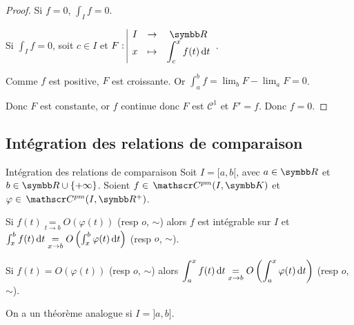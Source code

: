 \begin{proof}
    Si $f = 0$, $\int_I f = 0$.

    Si $\int_{I } f = 0$, soit $c \in I$ et $\fonction F I \R x {\int_c^x f(t) \dt}$.

    Comme $f$ est positive, $F$ est croissante. Or $\int_{a }^{b } f = \lim_b F - \lim_a F = 0$. 

    Donc $F$ est constante, or $f$ continue donc $F$ est $\mathscr C^1$ et $F' = f$. Donc 
    $f = 0$.
\end{proof}


\subsection{Intégration des relations de comparaison}

\begin{theoreme}{Intégration des relations de comparaison}{}
    Soit $I = [a,b[$, avec $a \in \R$ et $b \in \R \cup \{+\infty\}$. 
    Soient $f \in \mc {pm} (I, \K)$ et $\varphi \in \mc {pm}(I, \R^+)$.

    
    \svspace Si $f(t) \underset{t \to b }{=} O(\varphi(t))$ (resp $o$, $\sim$) alors $f$ est intégrable sur $I$ 
    et $\int_x^b f(t) \,\mathrm{d}t \underset{x \to b }{=} O\left( \int_x^b \varphi(t) \,\mathrm{d}t \right)$ (resp $o$, $\sim$).


    \svspace Si $f(t) = O(\varphi(t))$ (resp $o$, $\sim$) alors 
    $\displaystyle \int_{a }^{x } f(t) \,\mathrm{d}t \underset{x \to b }{=} O\left( \int_{a }^{x } \varphi(t) \,\mathrm{d}t \right)$ (resp $o$, $\sim$).
\end{theoreme}

\begin{remarque}
    On a un théorème analogue si $I = ]a, b]$. 
\end{remarque}

